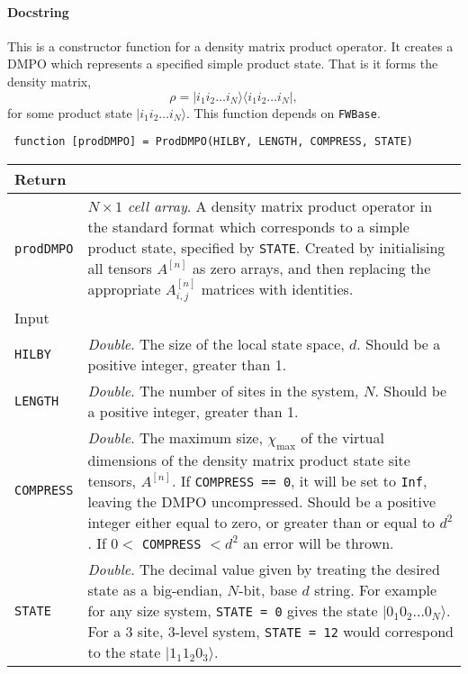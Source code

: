  \paragraph{Docstring} This is a constructor function for a density matrix product operator. It creates a DMPO which represents a specified simple product state. That is it forms the density matrix,
 \begin{equation}
 \rho = | i_{1} i_{2} \ldots i_{N} \rangle \langle i_{1} i_{2} \ldots i_{N} |,
 \label{eq:vs3-3}
 \end{equation}
 for some product state \(|i_{1} i_{2} \ldots i_{N} \rangle\). This function depends on \lstinline$FWBase$.
 \begin{lstlisting}
 function [prodDMPO] = ProdDMPO(HILBY, LENGTH, COMPRESS, STATE) \end{lstlisting}
 \begin{longtabu}{X[1,l]X[4,l]}
 \hline
 Return & \\ \hline
 \lstinline$prodDMPO$ & \emph{\(N \times 1\) cell array}. A density matrix product operator in the standard format which corresponds to a simple product state, specified by \lstinline$STATE$. Created by initialising all tensors \(A^{[n]}\) as zero arrays, and then replacing the appropriate \(A^{[n]}_{i,j}\) matrices with identities. \\ \hline
 Input & \\ \hline
 \lstinline$HILBY$ & \emph{Double}. The size of the local state space, \(d\). Should be a positive integer, greater than 1. \\
 \lstinline$LENGTH$ & \emph{Double}. The number of sites in the system, \(N\). Should be a positive integer, greater than 1. \\
 \lstinline$COMPRESS$ & \emph{Double}. The maximum size, \(\chi_{\mathrm{max}}\) of the virtual dimensions of the density matrix product state site tensors, \(A^{[n]}\). If \lstinline$COMPRESS == 0$, it will be set to \lstinline$Inf$, leaving the DMPO uncompressed. Should be a positive integer either equal to zero, or greater than or equal to \(d^{2}\). If \(0 <\) \lstinline$COMPRESS$ \(< d^{2}\) an error will be thrown. \\
 \lstinline$STATE$ & \emph{Double}. The decimal value given by treating the desired state as a big-endian, \(N\)-bit, base \(d\) string. For example for any size system, \lstinline$STATE = 0$ gives the state \(| 0_{1} 0_{2} \ldots 0_{N} \rangle \). For a 3 site, 3-level system, \lstinline$STATE = 12$ would correspond to the state \(|1_{1} 1_{2} 0_{3} \rangle\).  \\
 \hline
 \end{longtabu}
